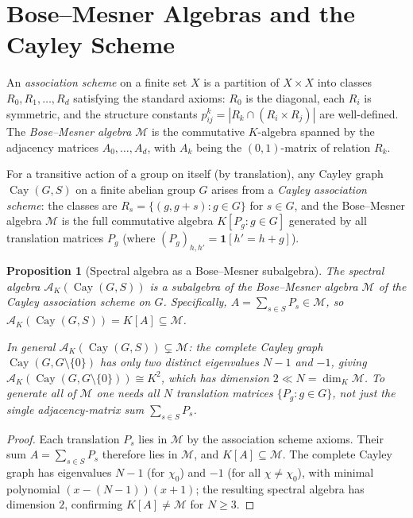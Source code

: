 \documentclass[12pt]{amsart}
\numberwithin{equation}{section}
\theoremstyle{plain}
\newtheorem{proposition}[theorem]{Proposition}
\theoremstyle{definition}
\DeclareMathOperator{\Cay}{Cay}
\newcommand{\calA}{\mathcal{A}}
\begin{document}
\section{Bose--Mesner Algebras and the Cayley Scheme}
\label{sec:bose}

An \emph{association scheme} on a finite set $X$ is a partition of
$X \times X$ into classes $R_0, R_1, \ldots, R_d$ satisfying the standard
axioms: $R_0$ is the diagonal, each $R_i$ is symmetric, and the structure
constants $p_{ij}^k = |R_k \cap (R_i \times R_j)|$ are well-defined.
The \emph{Bose--Mesner algebra} $\mathcal{M}$ is the commutative
$K$-algebra spanned by the adjacency matrices $A_0, \ldots, A_d$, with
$A_k$ being the $(0,1)$-matrix of relation $R_k$.

For a transitive action of a group on itself (by translation), any Cayley
graph $\Cay(G,S)$ on a finite abelian group $G$ arises from a
\emph{Cayley association scheme}: the classes are $R_s = \{(g,g+s) : g
\in G\}$ for $s \in G$, and the Bose--Mesner algebra $\mathcal{M}$ is
the full commutative algebra $K[P_g : g \in G]$ generated by all
translation matrices $P_g$ (where $(P_g)_{h,h'} = \mathbf{1}[h' = h+g]$).

\begin{proposition}[Spectral algebra as a Bose--Mesner subalgebra]
\label{prop:bose}
The spectral algebra $\calA_K(\Cay(G,S))$ is a subalgebra of the
Bose--Mesner algebra $\mathcal{M}$ of the Cayley association scheme on $G$.
Specifically, $A = \sum_{s \in S} P_s \in \mathcal{M}$, so
$\calA_K(\Cay(G,S)) = K[A] \subseteq \mathcal{M}$.

In general $\calA_K(\Cay(G,S)) \subsetneq \mathcal{M}$: the complete Cayley
graph $\Cay(G, G\setminus\{0\})$ has only two distinct eigenvalues $N-1$
and $-1$, giving $\calA_K(\Cay(G,G\setminus\{0\})) \cong K^2$, which has
dimension $2 \ll N = \dim_K \mathcal{M}$.  To generate all of $\mathcal{M}$
one needs all $N$ translation matrices $\{P_g : g \in G\}$, not just the
single adjacency-matrix sum $\sum_{s \in S} P_s$.
\end{proposition}

\begin{proof}
Each translation $P_s$ lies in $\mathcal{M}$ by the association scheme
axioms.  Their sum $A = \sum_{s \in S} P_s$ therefore lies in $\mathcal{M}$,
and $K[A] \subseteq \mathcal{M}$.  The complete Cayley graph has eigenvalues
$N-1$ (for $\chi_0$) and $-1$ (for all $\chi \ne \chi_0$), with minimal
polynomial $(x-(N-1))(x+1)$; the resulting spectral algebra has dimension
$2$, confirming $K[A] \ne \mathcal{M}$ for $N \ge 3$.
\end{proof}
\end{document}
